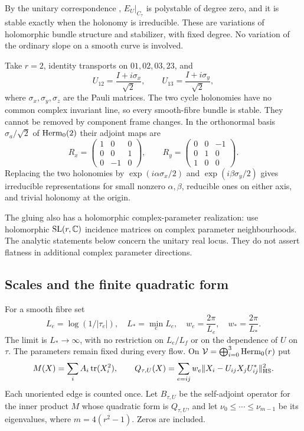 By the unitary correspondence \cite{narasimhan-seshadri},
$E_U|_{C_\tau}$ is polystable of degree zero, and it is stable
exactly when the holonomy is irreducible. These are variations
of holomorphic bundle structure and stabilizer, with fixed
degree. No variation of the ordinary slope on a smooth
curve is involved.

\begin{example}\label{ex:noncommuting}
Take $r=2$, identity transports on $01,02,03,23$, and
\[
 U_{12}=\frac{I+i\sigma_x}{\sqrt2},\qquad
 U_{13}=\frac{I+i\sigma_y}{\sqrt2},
\]
where $\sigma_x,\sigma_y,\sigma_z$ are the Pauli matrices.
The two cycle holonomies have no common complex invariant
line, so every smooth-fibre bundle is stable. They cannot
be removed by component frame changes. In the orthonormal
basis $\sigma_a/\sqrt2$ of $\operatorname{Herm}_0(2)$ their adjoint maps
are
\begin{equation}\label{eq:rotations}
 R_x=\begin{pmatrix}1&0&0\\0&0&1\\0&-1&0\end{pmatrix},
 \qquad
 R_y=\begin{pmatrix}0&0&-1\\0&1&0\\1&0&0\end{pmatrix}.
\end{equation}
Replacing the two holonomies by
$\exp(i\alpha\sigma_x/2)$ and
$\exp(i\beta\sigma_y/2)$ gives irreducible representations
for small nonzero $\alpha,\beta$, reducible ones on either
axis, and trivial holonomy at the origin.
\end{example}

The gluing also has a holomorphic complex-parameter
realization: use holomorphic $\operatorname{SL}(r,\mathbb C)$
incidence matrices on complex parameter neighbourhoods.
The analytic statements below concern the unitary real
locus. They do not assert flatness in additional complex
parameter directions.

\subsection{Scales and the finite quadratic form}
For a smooth fibre set
\begin{equation}\label{eq:weights}
 L_e=\log(1/|\tau_e|),\quad L_*=\min_eL_e,\quad
 w_e=\frac{2\pi}{L_e},\quad w_*=\frac{2\pi}{L_*}.
\end{equation}
The limit is $L_*\to\infty$, with no restriction on
$L_e/L_f$ or on the dependence of $U$ on $\tau$.
The parameters remain fixed during every flow.
On
$\mathcal V=\bigoplus_{i=0}^3\operatorname{Herm}_0(r)$ put
\begin{equation}\label{eq:finite-forms}
 M(X)=\sum_i A_i\operatorname{tr}(X_i^2),\qquad
 Q_{\tau,U}(X)=\sum_{e=ij}w_e
       \|X_i-U_{ij}X_jU_{ij}^*\|_{\mathrm{HS}}^2.
\end{equation}
Each unoriented edge is counted once. Let
$B_{\tau,U}$ be the self-adjoint operator for the inner
product $M$ whose quadratic form is $Q_{\tau,U}$, and
let $\nu_0\le\cdots\le\nu_{m-1}$ be its eigenvalues,
where $m=4(r^2-1)$. Zeros are included.

